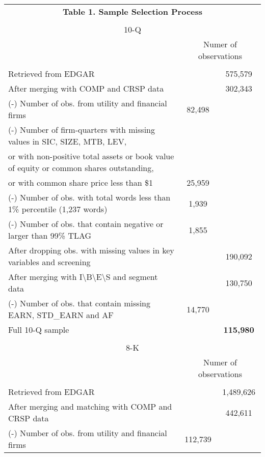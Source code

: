 \begin{table}[htbp] \label{T1}
  \centering
    \begin{tabular}{lcc}
    \multicolumn{3}{c}{\textbf{Table 1. Sample Selection Process}} \\ 
      & &  \\
    \multicolumn{3}{c}{10-Q} \\
     &   \multicolumn{2}{c}{Numer of observations}\\
      & &  \\
    Retrieved from EDGAR & & 575,579 \\
    After merging with COMP and CRSP data & & 302,343 \\
    (-) Number of obs. from utility and financial firms & 82,498 & \\
    (-) Number of firm-quarters with missing values in SIC, SIZE, MTB, LEV, & & \\
    \hspace{5mm}or with non-positive total assets or book value of equity or common shares outstanding, & & \\
    \hspace{5mm}or with common share price less than \$1 & 25,959 & \\
    (-) Number of obs. with total words less than 1\% percentile (1,237 words) & 1,939 & \\
    (-) Number of obs. that contain negative or larger than 99\% TLAG & 1,855 & \\
    \bottomrule
    After dropping obs. with missing values in key variables and screening & & 190,092 \\
    After merging with I\textbackslash{}B\textbackslash{}E\textbackslash{}S and segment data & & 130,750 \\
    (-) Number of obs. that contain missing EARN, STD\_EARN and AF & 14,770 & \\
    \bottomrule
    Full 10-Q sample & & \textbf{115,980} \\
      & &  \\
    \multicolumn{3}{c}{8-K} \\
     &   \multicolumn{2}{c}{Numer of observations}\\
      & &  \\
    Retrieved from EDGAR & & 1,489,626 \\
    After merging and matching with COMP and CRSP data  & & 442,611 \\
    (-) Number of obs. from utility and financial firms & 112,739 & \\

\end{tabular}
\end{table}
